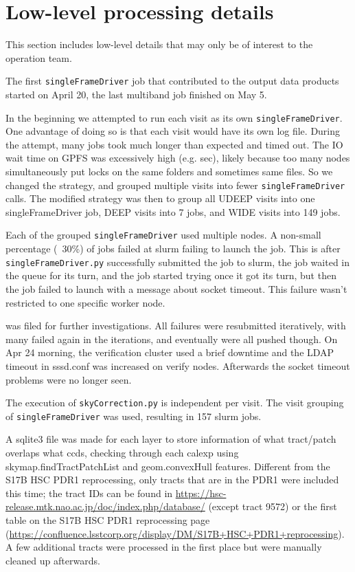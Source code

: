 \section{Low-level processing details}
This section includes low-level details that may only be of interest to the operation team.

The first \texttt{singleFrameDriver} job that contributed to the output data products started on April 20, the last multiband job finished on May 5.

In the beginning we attempted to run each visit as its own \texttt{singleFrameDriver}.
One advantage of doing so is that each visit would have its own log file.
During the attempt, many jobs took much longer than expected and timed out.
The IO wait time on GPFS was excessively high (e.g.  sec), likely because too many nodes simultaneously put locks on the same folders and sometimes same files.
So we changed the strategy, and grouped multiple visits into fewer \texttt{singleFrameDriver} calls.
The modified strategy was then to group all UDEEP visits into one singleFrameDriver job, DEEP visits into 7 jobs, and WIDE visits into 149 jobs.

Each of the grouped \texttt{singleFrameDriver} used multiple nodes.
A non-small percentage (~30\%) of jobs failed at slurm failing to launch the job.
This is after \texttt{singleFrameDriver.py} successfully submitted the job to slurm, the job waited in the queue for its turn, and the job started trying once it got its turn, but then the job failed to launch with a message about socket timeout.
This failure wasn't restricted to one specific worker node.
 
 was filed for further investigations.
All failures were resubmitted iteratively, with many failed again in the iterations, and eventually were all pushed though.
On Apr 24 morning, the verification cluster used a brief downtime and the LDAP timeout in sssd.conf was increased on verify nodes.
Afterwards the socket timeout problems were no longer seen.

The execution of \texttt{skyCorrection.py} is independent per visit.
The visit grouping of \texttt{singleFrameDriver} was used, resulting in 157 slurm jobs.

A sqlite3 file was made for each layer to store information of what tract/patch overlaps what ccds, checking through each calexp using skymap.findTractPatchList  and geom.convexHull features.
Different from the S17B HSC PDR1 reprocessing, only tracts that are in the PDR1 were included this time; the tract IDs can be found in \url{https://hsc-release.mtk.nao.ac.jp/doc/index.php/database/} (except tract 9572) or the first table on the S17B HSC PDR1 reprocessing page (\url{https://confluence.lsstcorp.org/display/DM/S17B+HSC+PDR1+reprocessing}).
A few additional tracts were processed in the first place but were manually cleaned up afterwards.

